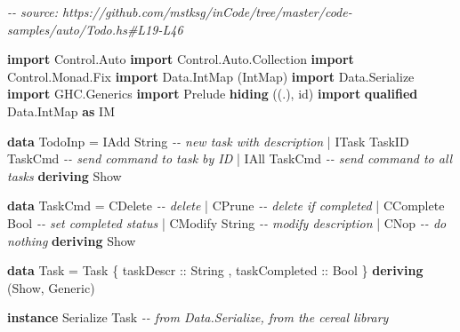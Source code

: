 \documentclass[]{article}
\newenvironment{Shaded}{}{}
\newcommand{\CommentTok}[1]{\textcolor[rgb]{0.38,0.63,0.69}{\textit{#1}}}
\newcommand{\DataTypeTok}[1]{\textcolor[rgb]{0.56,0.13,0.00}{#1}}
\newcommand{\KeywordTok}[1]{\textcolor[rgb]{0.00,0.44,0.13}{\textbf{#1}}}
\newcommand{\NormalTok}[1]{#1}
\newcommand{\OperatorTok}[1]{\textcolor[rgb]{0.40,0.40,0.40}{#1}}
\newcommand{\OtherTok}[1]{\textcolor[rgb]{0.00,0.44,0.13}{#1}}
\begin{document}
\begin{Shaded}
\begin{Highlighting}[]
\CommentTok{{-}{-} source: https://github.com/mstksg/inCode/tree/master/code{-}samples/auto/Todo.hs\#L19{-}L46}

\KeywordTok{import} \DataTypeTok{Control.Auto}
\KeywordTok{import} \DataTypeTok{Control.Auto.Collection}
\KeywordTok{import} \DataTypeTok{Control.Monad.Fix}
\KeywordTok{import} \DataTypeTok{Data.IntMap}\NormalTok{             (}\DataTypeTok{IntMap}\NormalTok{)}
\KeywordTok{import} \DataTypeTok{Data.Serialize}
\KeywordTok{import} \DataTypeTok{GHC.Generics}
\KeywordTok{import} \DataTypeTok{Prelude} \KeywordTok{hiding}\NormalTok{          ((.), id)}
\KeywordTok{import} \KeywordTok{qualified} \DataTypeTok{Data.IntMap}   \KeywordTok{as} \DataTypeTok{IM}

\KeywordTok{data} \DataTypeTok{TodoInp} \OtherTok{=} \DataTypeTok{IAdd}  \DataTypeTok{String}           \CommentTok{{-}{-} new task with description}
             \OperatorTok{|} \DataTypeTok{ITask} \DataTypeTok{TaskID} \DataTypeTok{TaskCmd}   \CommentTok{{-}{-} send command to task by ID}
             \OperatorTok{|} \DataTypeTok{IAll} \DataTypeTok{TaskCmd}           \CommentTok{{-}{-} send command to all tasks}
             \KeywordTok{deriving} \DataTypeTok{Show}

\KeywordTok{data} \DataTypeTok{TaskCmd} \OtherTok{=} \DataTypeTok{CDelete}          \CommentTok{{-}{-} delete}
             \OperatorTok{|} \DataTypeTok{CPrune}           \CommentTok{{-}{-} delete if completed}
             \OperatorTok{|} \DataTypeTok{CComplete} \DataTypeTok{Bool}   \CommentTok{{-}{-} set completed status}
             \OperatorTok{|} \DataTypeTok{CModify} \DataTypeTok{String}   \CommentTok{{-}{-} modify description}
             \OperatorTok{|} \DataTypeTok{CNop}             \CommentTok{{-}{-} do nothing}
             \KeywordTok{deriving} \DataTypeTok{Show}

\KeywordTok{data} \DataTypeTok{Task} \OtherTok{=} \DataTypeTok{Task}\NormalTok{ \{}\OtherTok{ taskDescr     ::} \DataTypeTok{String}
\NormalTok{                 ,}\OtherTok{ taskCompleted ::} \DataTypeTok{Bool}
\NormalTok{                 \} }\KeywordTok{deriving}\NormalTok{ (}\DataTypeTok{Show}\NormalTok{, }\DataTypeTok{Generic}\NormalTok{)}

\KeywordTok{instance} \DataTypeTok{Serialize} \DataTypeTok{Task} \CommentTok{{-}{-} from Data.Serialize, from the cereal library}
\end{Highlighting}
\end{Shaded}
\end{document}

